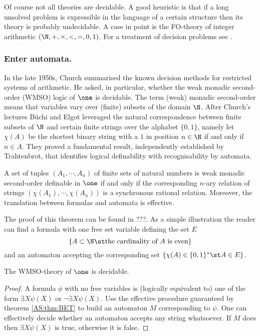 Of course not all theories are decidable. A good heuristic is that if a long
unsolved problem is expressible in the language of a certain structure then its theory
is probably undecidable. A case in point is the FO-theory of integer
arithmetic $(\N,+,\times,<,=,0,1)$.  For a treatment of decision problems see \cite{}.

\subsubsection{Enter automata.}
In the late 1950s, Church summarised the known decision methods for restricted
systems of arithmetic. He asked, in particular, whether the weak monadic second-order
(WMSO) logic of $\one$ is decidable.  The term (weak) monadic second-order
means that variables vary over (finite) subsets of the domain $\N$. After
Church's lectures B\"uchi and Elgot leveraged the natural correspondence
between finite subsets of $\N$ and certain finite strings over the alphabet $\{0,1\}$, namely
let $\chi(A)$ be the shortest binary string with a $1$ in position $n \in \N$ if and only if $n \in A$.
They proved a fundamental result,  independently established by Trahtenbrot, 
that identifies logical definability with recognisability by automata.

\begin{theorem} \label{AS:thm:BET}
A set of tuples $(A_1,\cdots,A_n)$ of finite sets of natural numbers is weak monadic
second-order definable in $\one$ if and only if the corresponding $n$-ary
relation of strings $(\chi(A_1),\cdots,\chi(A_n))$ is a synchronous rational relation. Moreover, the translation between formulas and automata is effective.
\end{theorem}

The proof of this theorem can be found in ???. As a simple illustration the reader can find 
a formula with one free set variable defining the set $E$
\[\{A \subset \N \st \mbox{the cardinality of $A$ is even}\}
\]
and an automaton accepting the corresponding set $\{\chi(A) \in \{0,1\}^\ast \st A \in E\}$.

\begin{corollary} \label{AS:cor:ws1s}
The WMSO-theory of $\one$ is decidable.
\end{corollary}

\begin{proof}
A formula $\phi$
with no free variables is (logically equivalent to) one of the form $\exists X
\psi(X)$ or $\neg \exists X \psi(X)$. Use the effective procedure guaranteed by
theorem \ref{AS:thm:BET} to build an automaton $M$ corresponding to $\psi$. One can
effectively decide whether an automaton accepts any string whatsoever. If $M$
does then $\exists X \psi(X)$ is true, otherwise it is false.
\end{proof}

